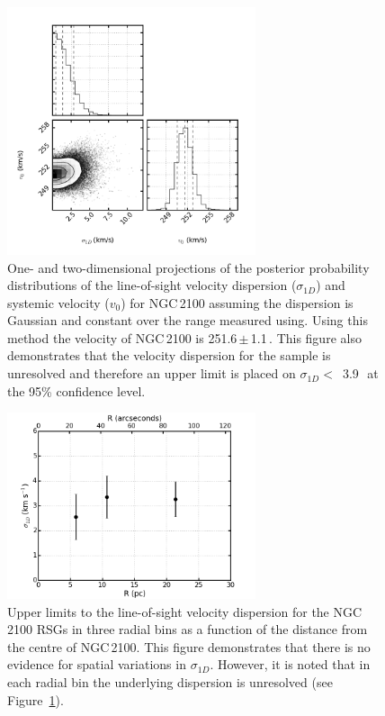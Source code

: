 \begin{figure}
\centering
 \includegraphics[width=0.65\textwidth]{ngc2100/NGC2100-sigRV-triangle}
 \caption{One- and two-dimensional projections of the posterior probability distributions of the line-of-sight velocity dispersion ($\sigma_{1D}$) and systemic velocity ($v_{0}$) for NGC\,2100 assuming the dispersion is Gaussian and constant over the range measured using.
 Using this method the velocity of NGC\,2100 is 251.6\,$\pm$\,1.1\,\kms.
 This figure also demonstrates that the velocity dispersion for the sample is unresolved and therefore an upper limit is placed on $\sigma_{1D} <$~3.9\,\kms~at the 95\% confidence level.
\label{fig:sig1d}
          }
\end{figure}

\begin{figure}
\centering
 \includegraphics[width=0.65\textwidth]{ngc2100/NGC2100-sig1d-bins}
 \caption{Upper limits to the line-of-sight velocity dispersion for the NGC\,2100 RSGs in three radial bins as a function of the distance from the centre of NGC\,2100.
 This figure demonstrates that there is no evidence for spatial variations in $\sigma_{1D}$.
 However, it is noted that in each radial bin the underlying dispersion is unresolved (see Figure~\ref{fig:sig1d}).
\label{fig:sig1dbins}
          }
\end{figure}

